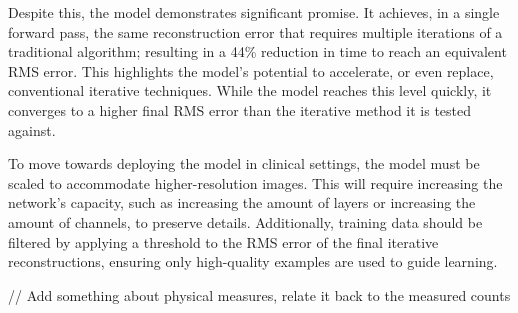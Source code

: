 \documentclass{article}
\begin{document}
Despite this, the model demonstrates significant promise. It achieves, in a single forward pass, the same reconstruction error that requires multiple iterations of a traditional algorithm; resulting in a 44\% reduction in time to reach an equivalent RMS error. This highlights the model's potential to accelerate, or even replace, conventional iterative techniques. While the model reaches this level quickly, it converges to a higher final RMS error than the iterative method it is tested against.

To move towards deploying the model in clinical settings, the model must be scaled to accommodate higher-resolution images. This will require increasing the network's capacity, such as increasing the amount of layers or increasing the amount of channels, to preserve details. Additionally, training data should be filtered by applying a threshold to the RMS error of the final iterative reconstructions, ensuring only high-quality examples are used to guide learning.

// Add something about physical measures, relate it back to the measured counts

\clearpage

\end{document}
